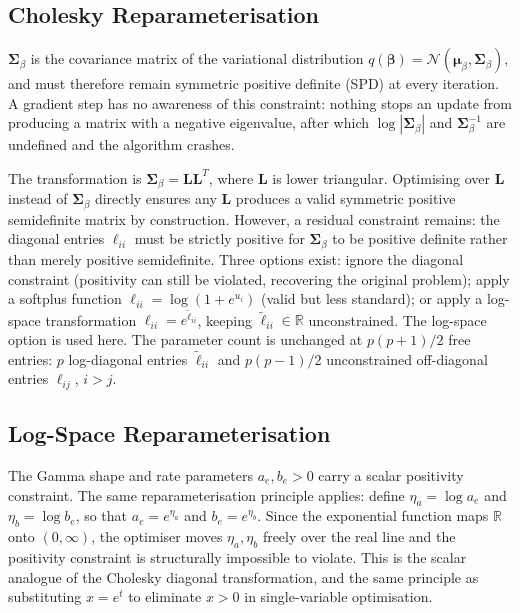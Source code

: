 \documentclass[11pt]{article}
\newcommand{\R}{\mathbb{R}}
\newcommand{\N}{\mathcal{N}}
\begin{document}
\subsection*{Cholesky Reparameterisation}

$\bm{\Sigma}_\beta$ is the covariance matrix of the variational distribution $q(\bm{\beta}) = \N(\bm{\mu}_\beta, \bm{\Sigma}_\beta)$, and must therefore remain symmetric positive definite (SPD) at every iteration. A gradient step has no awareness of this constraint: nothing stops an update from producing a matrix with a negative eigenvalue, after which $\log|\bm{\Sigma}_\beta|$ and $\bm{\Sigma}_\beta^{-1}$ are undefined and the algorithm crashes.

The transformation is $\bm{\Sigma}_\beta = \bm{L}\bm{L}^T$, where $\bm{L}$ is lower triangular. Optimising over $\bm{L}$ instead of $\bm{\Sigma}_\beta$ directly ensures any $\bm{L}$ produces a valid symmetric positive semidefinite matrix by construction. However, a residual constraint remains: the diagonal entries $\ell_{ii}$ must be strictly positive for $\bm{\Sigma}_\beta$ to be positive definite rather than merely positive semidefinite. Three options exist: ignore the diagonal constraint (positivity can still be violated, recovering the original problem); apply a softplus function $\ell_{ii} = \log(1 + e^{u_i})$ (valid but less standard); or apply a log-space transformation $\ell_{ii} = e^{\tilde{\ell}_{ii}}$, keeping $\tilde{\ell}_{ii} \in \R$ unconstrained. The log-space option is used here. The parameter count is unchanged at $p(p+1)/2$ free entries: $p$ log-diagonal entries $\tilde{\ell}_{ii}$ and $p(p-1)/2$ unconstrained off-diagonal entries $\ell_{ij}$, $i > j$.

\subsection*{Log-Space Reparameterisation}

The Gamma shape and rate parameters $a_e, b_e > 0$ carry a scalar positivity constraint. The same reparameterisation principle applies: define $\eta_a = \log a_e$ and $\eta_b = \log b_e$, so that $a_e = e^{\eta_a}$ and $b_e = e^{\eta_b}$. Since the exponential function maps $\R$ onto $(0, \infty)$, the optimiser moves $\eta_a, \eta_b$ freely over the real line and the positivity constraint is structurally impossible to violate. This is the scalar analogue of the Cholesky diagonal transformation, and the same principle as substituting $x = e^t$ to eliminate $x > 0$ in single-variable optimisation.
\end{document}
